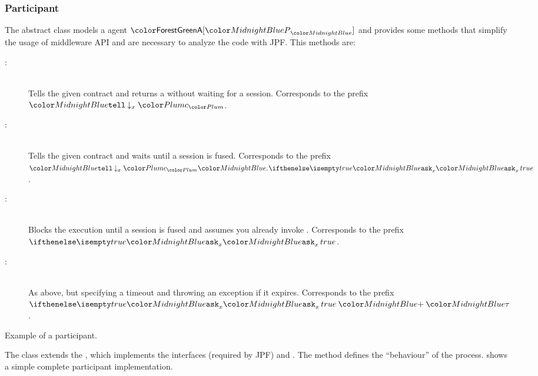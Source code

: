 \subsubsection{Participant}
The abstract class  models a \coco agent $\sys{\pmv{A}}{\procP}$ and provides some methods that simplify the usage of middleware API and are necessary to analyze the code with JPF. This methods are:
%
\begin{description}
	\item[ : ] \hfill \\
	Tells the given contract and returns a  without waiting for a session. Corresponds to the \coco prefix $\tell {} {\freeze x \contrP}$.
%
	\item[ : ] \hfill \\
	Tells the given contract and waits until a session is fused. Corresponds to the \coco prefix $\tell {} {\freeze x \contrP} \cocoSeq \ask{x}{true}$.
%	
	\item[ : ] \hfill \\
	Blocks the execution until a session is fused and assumes you already invoke . Corresponds to the \coco prefix $\ask{x}{true}$.
%	
	\item[ : ] \hfill \\
	As above, but specifying a timeout and throwing an exception if it expires. Corresponds to the \coco prefix $\ask{x}{true} \cocoPlus \tau$.
\end{description}

\begin{listing}[hp]
	\caption{Example of a participant.}
	\label{lst:process-participant}
\end{listing}

The  class extends the  , which implements the interfaces  (required by JPF) and . The  method defines the ``behaviour'' of the process.
 shows a simple complete participant implementation.
%

